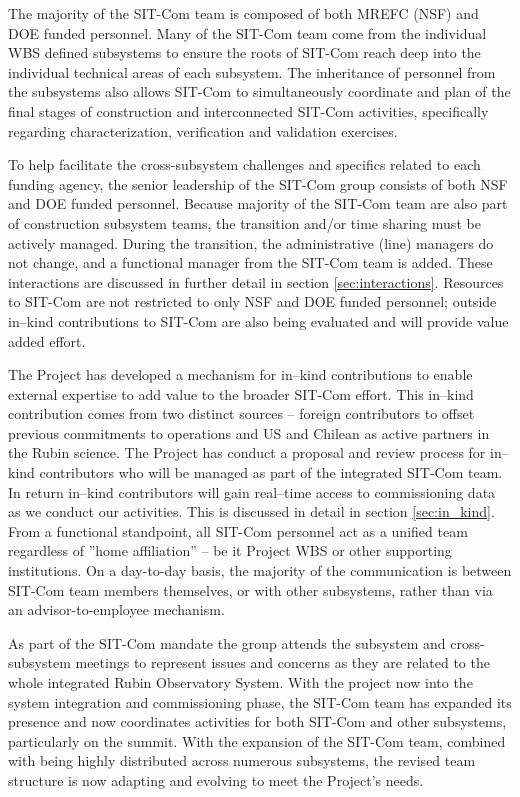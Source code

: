 \documentclass[SE,lsstdraft,authoryear,toc]{lsstdoc, lsstdraft}
\begin{document}
The majority of the SIT-Com team is composed of both MREFC (NSF) and DOE funded personnel.
Many of the SIT-Com team come from the individual WBS defined subsystems to ensure the roots of SIT-Com reach deep into the individual technical areas of each subsystem. 
The inheritance of personnel from the subsystems also allows SIT-Com to simultaneously coordinate and plan of the final stages of construction and interconnected SIT-Com activities, specifically regarding characterization, verification and validation exercises.

To help facilitate the cross-subsystem challenges and specifics related to each funding agency, the senior leadership of the SIT-Com group consists of both NSF and DOE funded personnel.
Because majority of the SIT-Com team are also part of construction subsystem teams, the transition and/or time sharing must be actively managed.
During the transition, the administrative (line) managers do not change, and a functional manager from the SIT-Com team is added.
These interactions are discussed in further detail in section \ref{sec:interactions}.
Resources to SIT-Com are not restricted to only NSF and DOE funded personnel; outside in--kind contributions to SIT-Com are also being evaluated and will provide value added effort.

The Project has developed a mechanism for in--kind contributions to enable external expertise to add value to the broader SIT-Com effort.
This in--kind contribution comes from two distinct sources -- foreign contributors to offset previous commitments to operations and US and Chilean as active partners in the Rubin science.
The Project has conduct a proposal and review process for in--kind contributors who will be managed as part of the integrated SIT-Com team.
In return in--kind contributors will gain real--time access to commissioning data as we conduct our activities.
This is discussed in detail in section \ref{sec:in_kind}.
From a functional standpoint, all SIT-Com personnel act as a unified team regardless of ''home affiliation'' -- be it Project WBS or other supporting institutions.
On a day-to-day basis, the majority of the communication is between SIT-Com team members themselves, or with other subsystems, rather than via an advisor-to-employee mechanism.

As part of the SIT-Com mandate the group attends the subsystem and cross-subsystem meetings to represent issues and concerns as they are related to the whole integrated Rubin Observatory System.
With the project now into the system integration and commissioning phase, the SIT-Com team has expanded its presence and now coordinates activities for both SIT-Com and other subsystems, particularly on the summit.
With the expansion of the SIT-Com team, combined with being highly distributed across numerous subsystems, the revised team structure is now adapting and evolving to meet the Project's needs.
\end{document}
